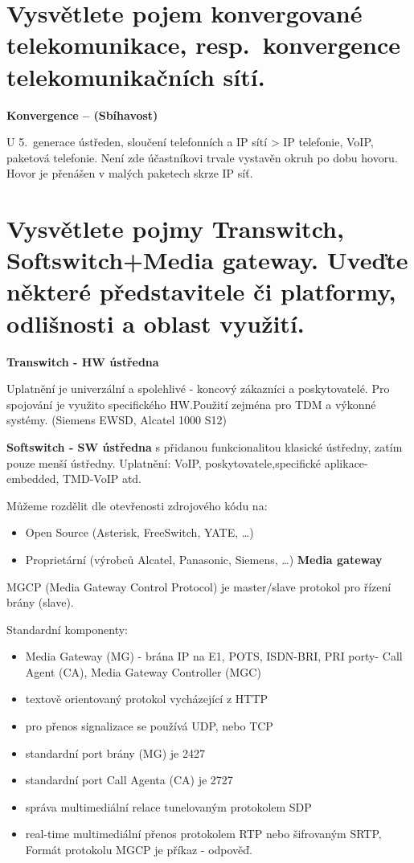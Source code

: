 \section{Vysvětlete pojem konvergované telekomunikace, resp.\ konvergence telekomunikačních sítí.}

\textbf{Konvergence -- (Sbíhavost)}

U 5.\ generace ústředen, sloučení telefonních a IP sítí > IP telefonie, VoIP, paketová telefonie. Není zde účastníkovi trvale vystavěn okruh po dobu hovoru. Hovor je přenášen v malých paketech skrze IP síť.

\section{Vysvětlete pojmy Transwitch, Softswitch+Media gateway. Uveďte některé představitele či platformy, odlišnosti a oblast využití.}

\textbf{Transwitch - HW ústředna}

Uplatnění je univerzální a spolehlivé - koncový zákazníci a poskytovatelé.
Pro spojování je využito specifického HW.\@ Použití zejména pro TDM a výkonné systémy. (Siemens EWSD, Alcatel 1000 S12)

\textbf{Softswitch - SW ústředna} s přidanou funkcionalitou klasické ústředny, zatím pouze menší ústředny. Uplatnění: VoIP, poskytovatele,specifické aplikace-embedded, TMD-VoIP atd.

Můžeme rozdělit dle otevřenosti zdrojového kódu na:
\begin{itemize}[noitemsep]
    \item Open Source (Asterisk, FreeSwitch, YATE, \ldots)
    \item Proprietární (výrobců Alcatel, Panasonic, Siemens, \ldots) \textbf{Media gateway}
\end{itemize}

\noindent MGCP (Media Gateway Control Protocol) je master/slave protokol pro řízení brány (slave).

Standardní komponenty:
\begin{itemize}[noitemsep]
    \item Media Gateway (MG) - brána IP na E1, POTS, ISDN-BRI, PRI porty- Call Agent (CA), Media Gateway Controller (MGC)
    \item textově orientovaný protokol vycházející z HTTP
    \item pro přenos signalizace se používá UDP, nebo TCP
    \item standardní port brány (MG) je 2427
    \item standardní port Call Agenta (CA) je 2727
    \item správa multimediální relace tunelovaným protokolem SDP
    \item real-time multimediální přenos protokolem RTP nebo šifrovaným SRTP, Formát protokolu MGCP je příkaz - odpověď.
\end{itemize}

